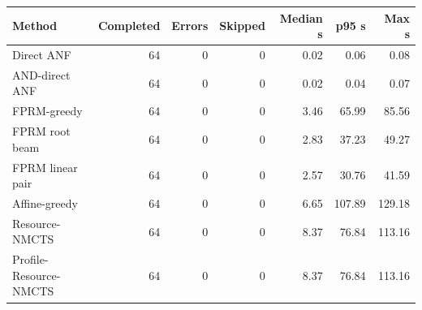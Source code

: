 \begin{tabular}{lrrrrrr}
\toprule
Method & Completed & Errors & Skipped & Median s & p95 s & Max s \\
\midrule
Direct ANF & 64 & 0 & 0 & 0.02 & 0.06 & 0.08 \\
AND-direct ANF & 64 & 0 & 0 & 0.02 & 0.04 & 0.07 \\
FPRM-greedy & 64 & 0 & 0 & 3.46 & 65.99 & 85.56 \\
FPRM root beam & 64 & 0 & 0 & 2.83 & 37.23 & 49.27 \\
FPRM linear pair & 64 & 0 & 0 & 2.57 & 30.76 & 41.59 \\
Affine-greedy & 64 & 0 & 0 & 6.65 & 107.89 & 129.18 \\
Resource-NMCTS & 64 & 0 & 0 & 8.37 & 76.84 & 113.16 \\
Profile-Resource-NMCTS & 64 & 0 & 0 & 8.37 & 76.84 & 113.16 \\
\bottomrule
\end{tabular}

